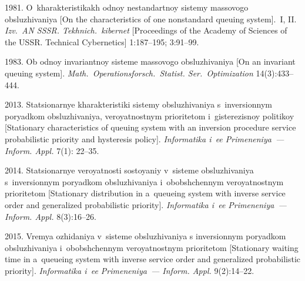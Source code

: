   \begin{multicols}{2}

\renewcommand{\bibname}{\protect\rmfamily References}

{\small\frenchspacing
 {%
 \begin{thebibliography}{99}
 
 \vspace*{-3pt}
 
 1981.
O~kharakteristikakh odnoy nestandartnoy sistemy
massovogo obsluzhivaniya
[On the characteristics of one nonstandard queuing
system].~I, II.
\textit{Izv.\ AN SSSR. Tekhnich.\ kibernet}
[Proceedings of the Academy of Sciences of
the USSR. Technical Cybernetics]
1:187--195; 3:91--99.

 1983.
Ob odnoy invariantnoy sisteme massovogo
obsluzhivaniya
[On an invariant queuing system].
\textit{Math.\ Operationsforsch.\ Statist.
Ser.\ Optimization} 14(3):433--444.

 2013.
Sta\-tsi\-o\-nar\-nye kharakteristiki sistemy obsluzhivaniya
s~in\-ver\-si\-on\-nym poryadkom obsluzhivaniya,
veroyatnostnym pri\-ori\-te\-tom i~gisterezisnoy politikoy
[Stationary characteristics of queuing system with
an inversion procedure service probabilistic priority
and hysteresis policy].
\textit{Informatika i~ee Primeneniya~--- Inform. Appl.} 7(1): 22--35.





 2014.
Sta\-tsi\-o\-nar\-nye veroyatnosti sostoyaniy v~sisteme obsluzhivaniya s~inversionnym 
poryadkom ob\-slu\-zhi\-va\-niya i~obob\-shchen\-nym veroyatnostnym prioritetom
[Stationary distribution in a~queueing system with inverse service order and
generalized probabilistic priority].
\textit{Informatika i~ee Primeneniya~--- Inform. Appl.} 8(3):16--26.

 2015.
Vremya ozhidaniya v~sisteme obsluzhivaniya s inversionnym poryadkom obsluzhivaniya 
i~obobshchennym veroyatnostnym prioritetom
[Stationary waiting time in a~queueing system with inverse service order and 
generalized probabilistic priority].
\textit{Informatika i~ee Primeneniya~--- Inform. Appl.} 9(2):14--22.


\end{thebibliography}}}
\end{multicols}
